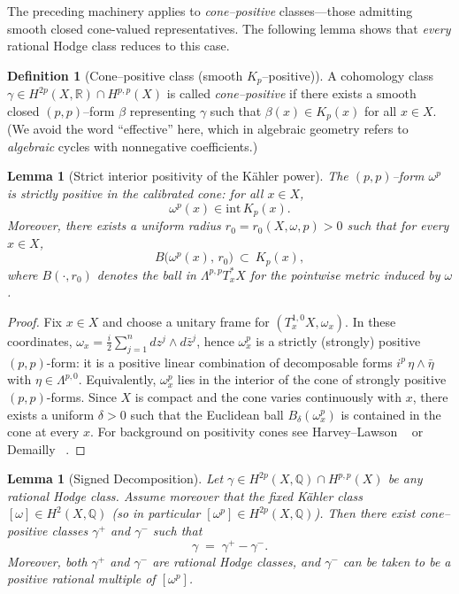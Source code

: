 \documentclass[11pt]{article}
\numberwithin{equation}{section}  %
\theoremstyle{plain}
\newtheorem{lemma}[theorem]{Lemma}
\theoremstyle{definition}
\newtheorem{definition}[theorem]{Definition}
\theoremstyle{remark}
\newcommand{\R}{\mathbb{R}}
\newcommand{\Q}{\mathbb{Q}}
\begin{document}
The preceding machinery applies to \emph{cone--positive} classes---those admitting
smooth closed cone-valued representatives.  The following lemma shows that \emph{every} rational
Hodge class reduces to this case.

\begin{definition}[Cone--positive class (smooth $K_p$--positive)]
A cohomology class $\gamma \in H^{2p}(X,\R) \cap H^{p,p}(X)$ is called
\emph{cone--positive} if there exists a smooth closed $(p,p)$--form $\beta$
representing $\gamma$ such that $\beta(x) \in K_p(x)$ for all $x \in X$.
(We avoid the word ``effective'' here, which in algebraic geometry refers to \emph{algebraic} cycles with nonnegative coefficients.)
\end{definition}

\begin{lemma}[Strict interior positivity of the K\"ahler power]\label{lem:kahler-positive}
The $(p,p)$--form $\omega^p$ is strictly positive in the calibrated cone: for all $x\in X$,
\[
\omega^p(x)\in \mathrm{int}\,K_p(x).
\]
Moreover, there exists a uniform radius $r_0=r_0(X,\omega,p)>0$ such that for every $x\in X$,
\[
B\bigl(\omega^p(x),\,r_0\bigr)\ \subset\ K_p(x),
\]
where $B(\cdot,r_0)$ denotes the ball in $\Lambda^{p,p}T_x^*X$ for the pointwise metric induced by $\omega$.
\end{lemma}


\begin{proof}
Fix $x\in X$ and choose a unitary frame for $(T^{1,0}_xX,\omega_x)$.
In these coordinates, $\omega_x=\frac{i}{2}\sum_{j=1}^n dz^j\wedge d\bar z^j$, hence
$\omega_x^p$ is a strictly (strongly) positive $(p,p)$-form: it is a positive linear
combination of decomposable forms $i^p\,\eta\wedge\bar\eta$ with $\eta\in\Lambda^{p,0}$.
Equivalently, $\omega_x^p$ lies in the interior of the cone of strongly positive $(p,p)$-forms.
Since $X$ is compact and the cone varies continuously with $x$, there exists a uniform
$\delta>0$ such that the Euclidean ball $B_\delta(\omega_x^p)$ is contained in the
cone at every $x$.  For background on positivity cones see Harvey--Lawson
~\cite{HL82}
or Demailly
~\cite{Demailly12}.
\end{proof}


\begin{lemma}[Signed Decomposition]\label{lem:signed-decomp}\label{thm:signed-decomp}
Let $\gamma \in H^{2p}(X,\Q) \cap H^{p,p}(X)$ be any rational Hodge class. Assume moreover that the fixed K\"ahler class $[\omega]\in H^2(X,\Q)$ (so in particular $[\omega^p]\in H^{2p}(X,\Q)$).
Then there exist cone--positive classes $\gamma^+$ and $\gamma^-$ such that
\[
\gamma \;=\; \gamma^+ - \gamma^-.
\]
Moreover, both $\gamma^+$ and $\gamma^-$ are rational Hodge classes,
and $\gamma^-$ can be taken to be a positive rational multiple of $[\omega^p]$.
\end{lemma}
\end{document}
